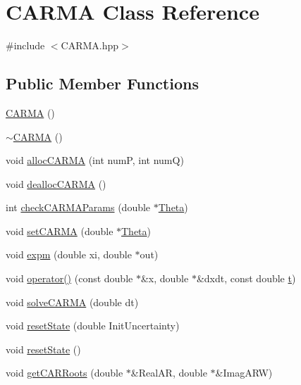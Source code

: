 \hypertarget{class_c_a_r_m_a}{\section{C\-A\-R\-M\-A Class Reference}
\label{class_c_a_r_m_a}
}


{\ttfamily \#include $<$C\-A\-R\-M\-A.\-hpp$>$}

\subsection*{Public Member Functions}
\begin{DoxyCompactItemize}
\item 
\hyperlink{class_c_a_r_m_a_a8871e02b301b503a987c03afc15c573c}{C\-A\-R\-M\-A} ()
\item 
\hyperlink{class_c_a_r_m_a_a19f2c3c41d81428c5f77a71f983dcc0b}{$\sim$\-C\-A\-R\-M\-A} ()
\item 
void \hyperlink{class_c_a_r_m_a_a6f96e596ba4a66b3f9eb7234292ad1d0}{alloc\-C\-A\-R\-M\-A} (int num\-P, int num\-Q)
\item 
void \hyperlink{class_c_a_r_m_a_af850b7e2ba5af3ae028aacfc0891b830}{dealloc\-C\-A\-R\-M\-A} ()
\item 
int \hyperlink{class_c_a_r_m_a_ad606acee248d451679b522172d7b9ac4}{check\-C\-A\-R\-M\-A\-Params} (double $\ast$\hyperlink{class_c_a_r_m_a_a5717e11c4a42a0d3c932a69e6493d22b}{Theta})
\item 
void \hyperlink{class_c_a_r_m_a_a70e6ec6090f629d43e9ed810346c766e}{set\-C\-A\-R\-M\-A} (double $\ast$\hyperlink{class_c_a_r_m_a_a5717e11c4a42a0d3c932a69e6493d22b}{Theta})
\item 
void \hyperlink{class_c_a_r_m_a_a7c7b27991e17ddc782909f903f375f90}{expm} (double xi, double $\ast$out)
\item 
void \hyperlink{class_c_a_r_m_a_aab53261f484dfa74a29d88e345fa0715}{operator()} (const double $\ast$\&x, double $\ast$\&dxdt, const double \hyperlink{class_c_a_r_m_a_a47e298ceac5c77b96f70f520119d0eb7}{t})
\item 
void \hyperlink{class_c_a_r_m_a_ab40779c2e688ef40afe4c925a777ebc7}{solve\-C\-A\-R\-M\-A} (double dt)
\item 
void \hyperlink{class_c_a_r_m_a_a8748732c23bc65486b9df8f25a905cf9}{reset\-State} (double Init\-Uncertainty)
\item 
void \hyperlink{class_c_a_r_m_a_a44b60949dc1cbcccb24873a117faa5ac}{reset\-State} ()
\item 
void \hyperlink{class_c_a_r_m_a_afad6e999f5171c8dbe5618f39ac49433}{get\-C\-A\-R\-Roots} (double $\ast$\&Real\-A\-R, double $\ast$\&Imag\-A\-R\-W)

\end{DoxyCompactItemize}
